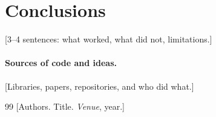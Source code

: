 \documentclass[11pt,a4paper]{article}
\begin{document}
\section{Conclusions}
[3--4 sentences: what worked, what did not, limitations.]

\paragraph{Sources of code and ideas.} [Libraries, papers, repositories, and who did what.]

\begin{thebibliography}{99}\footnotesize
{} [Authors. Title. \emph{Venue}, year.]
\end{thebibliography}
\end{document}
